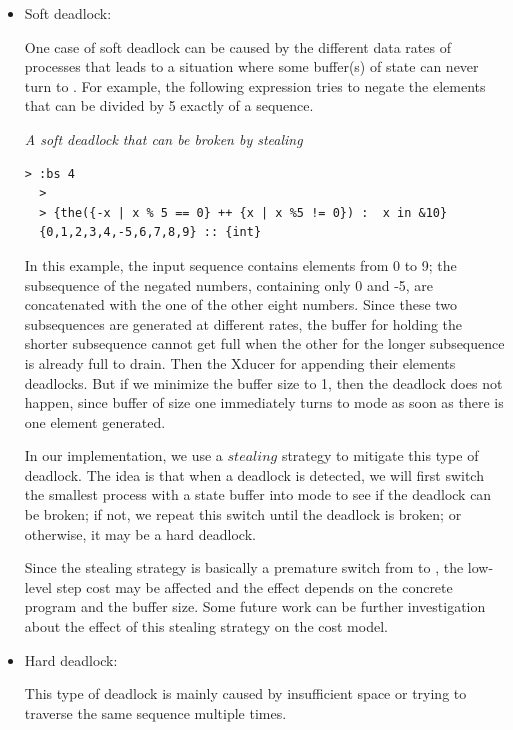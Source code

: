 \begin{itemize}

\item Soft deadlock: 

One case of soft deadlock can be caused by the different data rates of processes that leads to a situation where some buffer(s) of {\filling} state can never turn to {\draining}. 
For example, the following expression tries to negate the elements that can be divided by 5 exactly of a sequence.
\begin{example}\emph{ A soft deadlock that can be broken by stealing}
\end{example}
\begin{lstlisting}[style=nesl-style]
  > :bs 4
  >
  > {the({-x | x % 5 == 0} ++ {x | x %5 != 0}) :  x in &10}
  {0,1,2,3,4,-5,6,7,8,9} :: {int}
\end{lstlisting}


In this example, the input sequence contains elements from 0 to 9; the subsequence of the negated numbers, containing only 0 and -5, are concatenated with the one of the other eight numbers. 
Since these two subsequences are generated at different rates,
the buffer for holding the shorter subsequence cannot get full when the other for the longer subsequence is already full to drain.
Then the Xducer for appending their elements deadlocks.
But if we minimize the buffer size to 1, then the deadlock does not happen, since buffer of size one immediately turns to {\draining} mode as soon as there is one element generated. 

In our implementation, we use a $stealing$ strategy to mitigate this type of deadlock. 
The idea is that when a deadlock is detected, we will first switch the smallest process with a {\filling} state buffer into {\draining} mode to see if the deadlock can be broken; if not, we repeat this switch until the deadlock is broken; or otherwise, it may be a hard deadlock.

Since the stealing strategy is basically a premature
switch from {\filling} to {\draining}, the low-level step cost may be affected and the effect depends on the concrete program and the buffer size. 
Some future work can be further investigation about the effect of this stealing strategy on the cost model.\\


\item Hard deadlock: 

This type of deadlock is mainly caused by insufficient space or trying to traverse the same sequence multiple times. 


\end{itemize}
